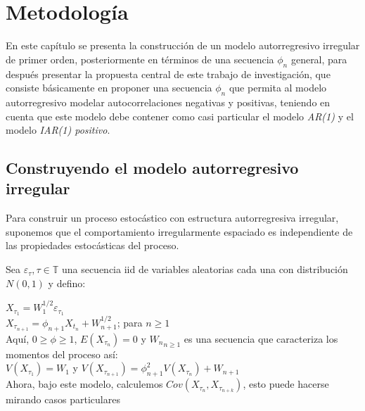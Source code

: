 \chapter{Metodología}

En este capítulo se presenta la construcción de un modelo autorregresivo irregular de primer orden, 
posteriormente en términos de una secuencia $\phi_{n}$ general, para después presentar la propuesta central
de este trabajo de investigación, que consiste básicamente en proponer una secuencia $\phi_{n}$ que permita
al modelo autorregresivo modelar autocorrelaciones negativas y positivas, teniendo en cuenta que este modelo
debe contener como casi particular el modelo \emph{AR(1)} y el modelo \emph{IAR(1) positivo}.

\section{Construyendo el modelo autorregresivo irregular}

Para construir un proceso estocástico con estructura autorregresiva irregular, suponemos que el comportamiento irregularmente espaciado es independiente de las propiedades estocásticas del proceso.

Sea ${\varepsilon_{\tau}, \tau \in \mathbb{T}}$ una secuencia iid de variables aleatorias cada una con distribución $N(0,1)$ y defino:

$X_{\tau_{1}} = W_1^{1/2} \varepsilon_{\tau_{1}}$\\
$X_{\tau_{n+1}} = \phi_{n+1} X_{t_n} +W_{n+1}^{1/2}$;    para $n \geq 1$\\

Aquí, $0 \geq \phi \geq 1$, $E(X_{\tau_{n}}) = 0$ y ${W_{n}}_{n\geq 1}$ es una secuencia que caracteriza los momentos del proceso así:\\

$V(X_{\tau_{1}})= W_1$ y $V(X_{\tau_{n+1}}) = \phi_{n+1}^{2}V(X_{\tau_{n}}) + W_{n+1}$\\

Ahora, bajo este modelo, calculemos $Cov(X_{\tau_{n}}, X_{\tau_{n+k}})$, esto puede hacerse mirando casos particulares

